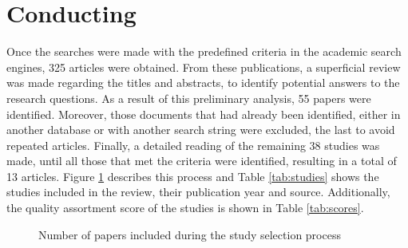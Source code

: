 \documentclass[conference]{IEEEtran}
\begin{document}
\section{Conducting}
\label{conducting}

Once the searches were made with the predefined criteria in the academic search engines, 325 articles were obtained. From these publications, a superficial review was made regarding the titles and abstracts, to identify potential answers to the research questions. As a result of this preliminary analysis, 55 papers were identified. Moreover, those documents that had already been identified, either in another database or with another search string were excluded, the last to avoid repeated articles. Finally, a detailed reading of the remaining 38 studies was made, until all those that met the criteria were identified, resulting in a total of 13 articles. Figure \ref{fig:rsl} describes this process and Table \ref{tab:studies} shows the studies included in the review, their publication year and source. Additionally, the quality assortment score of the studies is shown in Table \ref{tab:scores}.

\begin{figure}[!htbp]
    \caption{\label{fig:rsl}Number of papers included during the study selection process}
\end{figure}
\end{document}

